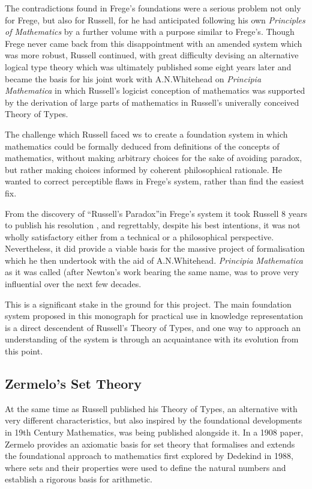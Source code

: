 The contradictions found in Frege's foundations were a serious problem not only for Frege, but also for Russell, for he had anticipated following his own \emph{Principles of Mathematics}\cite{russellPRM} by a further volume with a purpose similar to Frege's.
Though Frege never came back from this disappointment with an amended system which was more robust, Russell continued, with great difficulty devising an alternative logical type theory which was ultimately published some eight years later \cite{russell1908} and became the basis for his joint work with A.N.Whitehead on \emph{Principia Mathematica}\cite{russell10} in which Russell's logicist conception of mathematics was supported by the derivation of large parts of mathematics in Russell's univerally conceived Theory of Types.

The challenge which Russell faced ws to create a foundation system in which mathematics could be formally deduced from definitions of the concepts of mathematics, without making arbitrary choices for the sake of avoiding paradox, but rather making choices informed by coherent philosophical rationale.
He wanted to correct perceptible flaws in Frege's system, rather than find the easiest fix.

From the discovery of ``Russell's Paradox''in Frege's system it took Russell 8 years to publish his resolution \cite{russell08}, and regrettably, despite his best intentions, it was not wholly satisfactory either from a technical or a philosophical perspective.
Nevertheless, it did provide a viable basis for the massive project of formalisation which he then undertook with the aid of A.N.Whitehead.
\emph{Principia Mathematica} \cite{russell10} as it was called (after Newton's work bearing the same name, was to prove very influential over the next few decades.

This is a significant stake in the ground for this project.
The main foundation system proposed in this monograph for practical use in knowledge representation is a direct descendent of Russell's Theory of Types, and one way to approach an understanding of the system is through an acquaintance with its evolution from this point.

\subsection{Zermelo's Set Theory}

At the same time as Russell published his Theory of Types, an alternative with very different characteristics, but also inspired by the foundational developments in 19th Century Mathematics, was being published alongside it.
In a 1908 paper, Zermelo\cite{zermelo08} provides an axiomatic basis for set theory that formalises and extends the foundational approach to mathematics first explored by Dedekind in 1988\cite{dedekind1888}, where sets and their properties were used to define the natural numbers and establish a rigorous basis for arithmetic.

